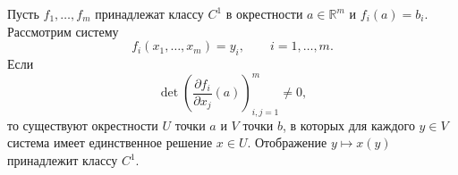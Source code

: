 \label{definition:06}

\begin{theorem}
Пусть $f_1,\ldots,f_m$ принадлежат классу $C^1$ в окрестности $a\in\mathbb R^m$ и $f_i(a)=b_i$.
Рассмотрим систему
\[
  f_i(x_1,\ldots,x_m)=y_i,\qquad i=1,\ldots,m.
\]
Если
\[
  \det\left(\frac{\partial f_i}{\partial x_j}(a)\right)_{i,j=1}^{m}\ne0,
\]
то существуют окрестности $U$ точки $a$ и $V$ точки $b$, в которых для каждого $y\in V$ система имеет единственное решение $x\in U$.
Отображение $y\mapsto x(y)$ принадлежит классу $C^1$.
\end{theorem}
